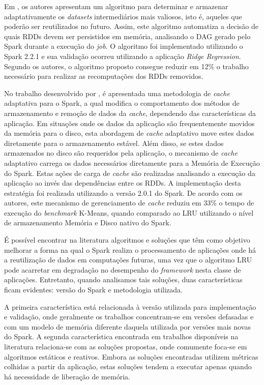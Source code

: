 Em \cite{yang2018intermediate}, os autores apresentam um algoritmo para determinar e armazenar adaptativamente os \textit{datasets} intermediários mais valiosos, isto é, aqueles que poderão ser reutilizados no futuro. Assim, este algoritmo automatiza a decisão de quais RDDs devem ser persistidos em memória, analisando o DAG gerado pelo Spark durante a execução do \textit{job}. O algoritmo foi implementado utilizando o Spark 2.2.1 e sua validação ocorreu utilizando a aplicação \textit{Ridge Regression}. Segundo os autores, o algoritmo proposto consegue reduzir em 12\% o trabalho necessário para realizar as recomputações dos RDDs removidos.

No trabalho desenvolvido por \cite{inagaki2018adaptive}, é apresentada uma metodologia de \textit{cache} adaptativa para o Spark, a qual modifica o comportamento dos métodos de armazenamento e remoção de dados da \textit{cache}, dependendo das características da aplicação. Em situações onde os dados da aplicação são frequentemente movidos da memória para o disco, esta abordagem de \textit{cache} adaptativo move estes dados diretamente para o armazenamento estável. Além disso, se estes dados armazenados no disco são requeridos pela aplicação, o mecanismo de \textit{cache} adaptativo carrega os dados necessários diretamente para a Memória de Execução do Spark. Estas ações de carga de \textit{cache} são realizadas analisando a execução da aplicação ao invés das dependências entre os RDDs. A implementação desta estratégia foi realizada utilizando a versão 2.0.1 do Spark. De acordo com os autores, este mecanismo de gerenciamento de \textit{cache} reduziu em 33\% o tempo de execução do \textit{benchmark} K-Means, quando comparado ao LRU utilizando o nível de armazenamento Memória e Disco nativo do Spark. 

É possível encontrar na literatura algoritmos e soluções que têm como objetivo melhorar a forma na qual o Spark realiza o processamento de aplicações onde há a reutilização de dados em computações futuras, uma vez que o algoritmo LRU pode acarretar em degradação no desempenho do \textit{framework} nesta classe de aplicações. Entretanto, quando analisamos tais soluções, duas características ficam evidentes: versão do Spark e metodologia utilizada. 

A primeira característica está relacionada à versão utilizada para implementação e validação, onde geralmente os trabalhos concentram-se em versões defasadas e com um modelo de memória diferente daquela utilizada por versões mais novas do Spark. A segunda característica encontrada em trabalhos disponíveis na literatura relaciona-se com as soluções propostas, onde comumente foca-se em algoritmos estáticos e reativos. Embora as soluções encontradas utilizem métricas colhidas a partir da aplicação, estas soluções tendem a executar apenas quando há necessidade de liberação de memória.

